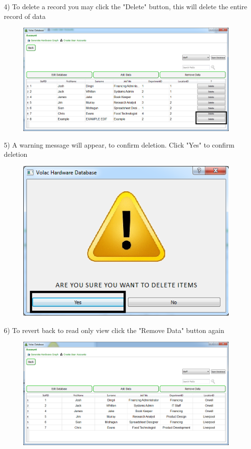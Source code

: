 4) To delete a record you may click the "Delete" button, this will delete the entire record of data

\begin{figure}[H]
    \includegraphics[width=\textwidth]{./Manual/Images/deletedata2.png}
\end{figure}

5) A warning message will appear, to confirm deletion. Click "Yes" to confirm deletion

\begin{figure}[H]
    \includegraphics[width=\textwidth]{./Manual/Images/deletedata3.png}
\end{figure}

6) To revert back to read only view click the "Remove Data" button again

\begin{figure}[H]
    \includegraphics[width=\textwidth]{./Manual/Images/deletedata4.png}
\end{figure}


